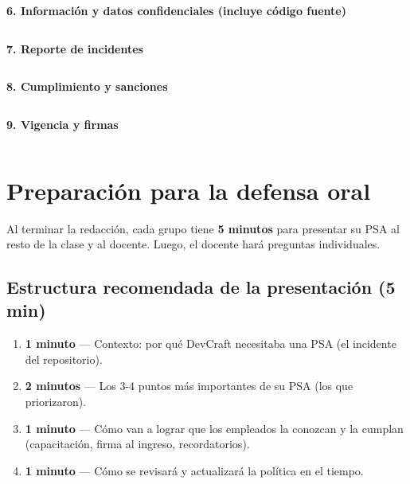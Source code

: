 \documentclass[12pt,a4paper]{article}
\begin{document}
\vspace{6pt}
\noindent\textbf{6. Informaci\'on y datos confidenciales (incluye c\'odigo fuente)}
\begin{tabularx}{\textwidth}{|X|}
\hline
\\[2.5cm]
\hline
\end{tabularx}

\newpage
\noindent\textbf{7. Reporte de incidentes}
\begin{tabularx}{\textwidth}{|X|}
\hline
\\[2cm]
\hline
\end{tabularx}

\vspace{6pt}
\noindent\textbf{8. Cumplimiento y sanciones}
\begin{tabularx}{\textwidth}{|X|}
\hline
\\[2cm]
\hline
\end{tabularx}

\vspace{6pt}
\noindent\textbf{9. Vigencia y firmas}
\begin{tabularx}{\textwidth}{|X|}
\hline
\\[1.5cm]
\hline
\end{tabularx}

\newpage
\section{Preparaci\'on para la defensa oral}

Al terminar la redacci\'on, cada grupo tiene \textbf{5 minutos} para presentar su PSA al resto de la clase y al docente. Luego, el docente har\'a preguntas individuales.

\subsection{Estructura recomendada de la presentaci\'on (5 min)}
\begin{enumerate}[leftmargin=2em]
    \item \textbf{1 minuto} — Contexto: por qu\'e DevCraft necesitaba una PSA (el incidente del repositorio).
    \item \textbf{2 minutos} — Los 3-4 puntos m\'as importantes de su PSA (los que priorizaron).
    \item \textbf{1 minuto} — C\'omo van a lograr que los empleados la conozcan y la cumplan (capacitaci\'on, firma al ingreso, recordatorios).
    \item \textbf{1 minuto} — C\'omo se revisar\'a y actualizar\'a la pol\'itica en el tiempo.
\end{enumerate}
\end{document}
